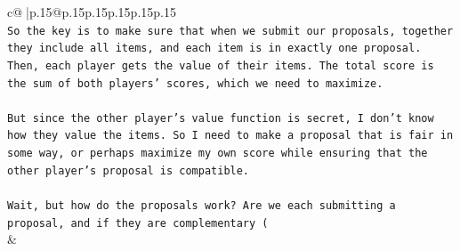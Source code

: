 \documentclass{article}
\begin{document}
{\begin{supertabular}{c@{$\;$}|p{.15\linewidth}@{}p{.15\linewidth}p{.15\linewidth}p{.15\linewidth}p{.15\linewidth}p{.15\linewidth}}
{{{\\ 
\texttt{So the key is to make sure that when we submit our proposals, together they include all items, and each item is in exactly one proposal. Then, each player gets the value of their items. The total score is the sum of both players' scores, which we need to maximize.} \\
\\ 
\texttt{But since the other player's value function is secret, I don't know how they value the items. So I need to make a proposal that is fair in some way, or perhaps maximize my own score while ensuring that the other player's proposal is compatible.} \\
\\ 
\texttt{Wait, but how do the proposals work? Are we each submitting a proposal, and if they are complementary (} \\
            }
        }
    }
    & \\ \\


\end{supertabular}}
\end{document}
